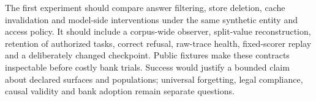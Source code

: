 The first experiment should compare answer filtering, store deletion, cache
invalidation and model-side interventions under the same synthetic entity and
access policy. It should include a corpus-wide observer, split-value
reconstruction, retention of authorized tasks, correct refusal, raw-trace health,
fixed-scorer replay and a deliberately changed checkpoint. Public fixtures make
these contracts inspectable before costly bank trials. Success would justify
a bounded claim about declared surfaces and populations; universal forgetting,
legal compliance, causal validity and bank adoption remain separate questions.

